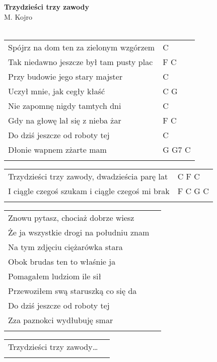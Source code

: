\documentclass[a5paper]{article}
\begin{document}


\noindent
\fontsize{12pt}{15pt}\selectfont
\textbf{Trzydzieści trzy zawody} \\
\fontsize{8pt}{10pt}\selectfont
M. Kojro \\ \\
\fontsize{10pt}{12pt}\selectfont
{}
\begin{tabular}{@{}p{8.50cm}p{3cm}@{}}
\noindent
Spójrz na dom ten za zielonym wzgórzem & C \\
Tak niedawno jeszcze był tam pusty plac & F C \\
Przy budowie jego stary majster & C \\
Uczył mnie, jak cegły kłaść & C G \\
Nie zapomnę nigdy tamtych dni & C \\
Gdy na głowę lał się z nieba żar & F C \\
Do dziś jeszcze od roboty tej & C \\
Dłonie wapnem zżarte mam & G G7 C \\ \\
\end{tabular}

\noindent
\begin{tabular}{@{}p{7.50cm}p{3cm}@{}} 
Trzydzieści trzy zawody, dwadzieścia parę lat & C F C \\
I ciągle czegoś szukam i ciągle czegoś mi brak & F C G C \\ \\
\end{tabular}

\noindent
\begin{tabular}{@{}p{7.50cm}p{3cm}@{}}
Znowu pytasz, chociaż dobrze wiesz \\
Że ja wszystkie drogi na południu znam\\
Na tym zdjęciu ciężarówka stara\\
Obok brudas ten to właśnie ja\\
Pomagałem ludziom ile sił\\
Przewoziłem swą staruszką co się da\\
Do dziś jeszcze od roboty tej\\
Zza paznokci wydłubuję smar\\\\
\end{tabular}

\noindent
\begin{tabular}{@{}p{7.50cm}p{3cm}@{}}
Trzydzieści trzy zawody… \\ \\
\end{tabular}
\end{document}
